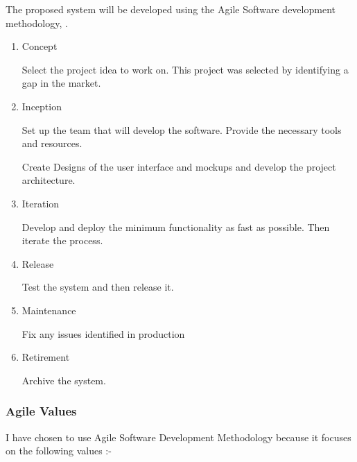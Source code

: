
The proposed system will be developed using the Agile Software development methodology, \citep{agilemanifesto}.

\begin{enumerate}
      \item Concept

            Select the project idea to work on. This project was selected by identifying a gap in the market.

      \item Inception

            Set up the team that will develop the software. Provide the necessary tools and resources.

            Create Designs of the user interface and mockups and develop the project architecture.

      \item Iteration

            Develop and deploy the minimum functionality as fast as possible. Then iterate the process.

      \item Release

            Test the system and then release it.

      \item Maintenance

            Fix any issues identified in production

      \item Retirement

            Archive the system.
\end{enumerate}

\subsubsection{Agile Values}

I have chosen to use Agile Software Development Methodology because it focuses on the following values :-

